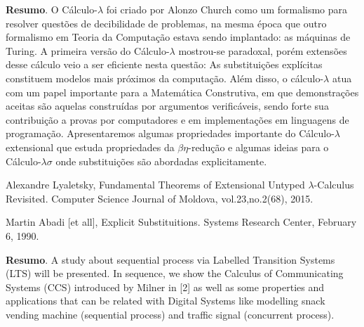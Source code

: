 %	
%	
	\noindent\textbf{Resumo}.\label{ksdf} 
	O Cálculo-$\lambda$ foi criado por Alonzo Church como um formalismo para resolver questões de decibilidade de problemas, na mesma época que outro formalismo em Teoria da Computação estava sendo implantado: as máquinas de Turing. A primeira versão do Cálculo-$\lambda$ mostrou-se paradoxal, porém extensões desse cálculo veio a ser eficiente nesta questão: As substituições explícitas constituem modelos mais próximos da computação. Além disso, o cálculo-$\lambda$ atua com um papel importante para a Matemática Construtiva, em que demonstrações aceitas são aquelas construídas por argumentos verificáveis, sendo forte sua contribuição a provas por computadores e em implementações em linguagens de programação. Apresentaremos algumas propriedades importante do Cálculo-$\lambda$ extensional que estuda propriedades da $\beta\eta$-redução e algumas ideias para o Cálculo-$\lambda\sigma$ onde substituições são abordadas explicitamente.
%	
	\begin{thebibliography}{999}
	
	\bibitem{} Alexandre Lyaletsky, Fundamental Theorems of Extensional Untyped $\lambda$-Calculus Revisited. Computer Science Journal of Moldova, vol.23,no.2(68), 2015.

	\bibitem{} Martin Abadi [et all], Explicit Substituitions. Systems Research Center, February 6, 1990.
	\end{thebibliography}
	\vspace{24pt}
	
	
	\noindent\textbf{Resumo}.\label{labm} 
	A study about sequential process via Labelled Transition Systems (LTS) will be presented. In sequence, we show the Calculus of Communicating Systems (CCS) introduced by Milner in [2] as well as some properties and applications that can be related with Digital Systems like modelling snack vending machine (sequential process) and traffic signal (concurrent process).

